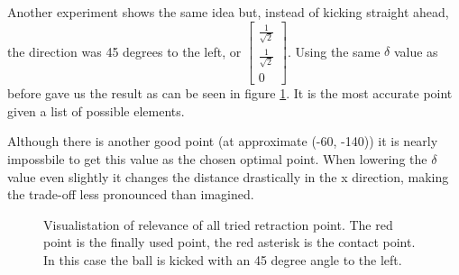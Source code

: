 \documentclass[a4paper]{article}
\begin{document}
Another experiment shows the same idea but, instead of kicking straight ahead,
the direction was 45 degrees to the left, or $\begin{bmatrix} \frac{1}{\sqrt{2}} \\
\frac{1}{\sqrt{2}} \\ 0 \end{bmatrix}$. Using the same $\delta$ value as before gave us
the result as can be seen in figure \ref{fig:retraction_plot2}. It is the most
accurate point given a list of possible elements. 

Although there is another good point (at approximate (-60, -140)) it is nearly
impossbile to get this value as the chosen optimal point. When lowering the
$\delta$ value even slightly it changes the distance drastically in the x
direction, making the trade-off less pronounced than imagined.

\begin{figure}[htbp]
  \centering
  \caption{Visualistation of relevance of all tried retraction point. The red
      point is the finally used point, the red asterisk is the contact point. 
      In this case the ball is kicked with an 45 degree angle to the left.
         }
  \label{fig:retraction_plot2}
\end{figure}
\end{document}
